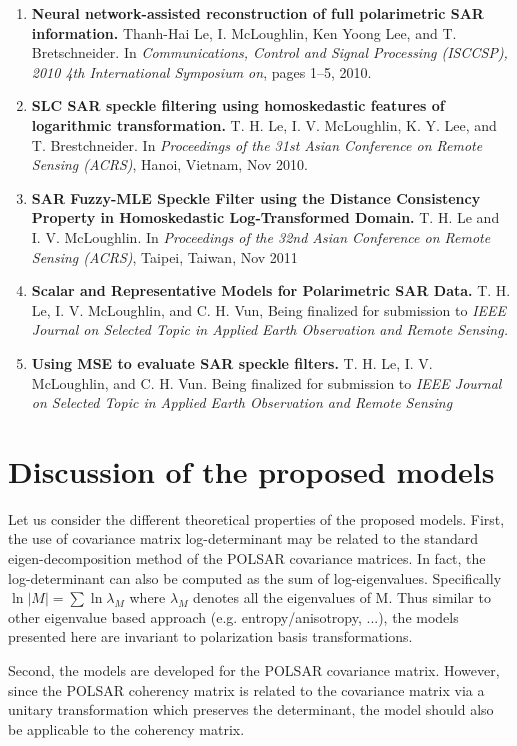 \begin{enumerate}
\item \textbf{Neural network-assisted reconstruction of full polarimetric SAR information.}
  Thanh-Hai Le, I. McLoughlin, Ken Yoong Lee, and T. Bretschneider.
  In \textit{Communications, Control and Signal Processing (ISCCSP), 2010 4th International Symposium on}, pages 1–5, 2010.  \cite{Le_2010_ISCCSP} 
\item \textbf{SLC SAR speckle filtering using homoskedastic features of logarithmic transformation.}
  T. H. Le, I. V. McLoughlin, K. Y. Lee, and T. Brestchneider.
  In \textit{Proceedings of the 31st Asian Conference on Remote Sensing (ACRS)}, Hanoi, Vietnam, Nov 2010. \cite{Le_2010_ACRS}
\item  \textbf{SAR Fuzzy-MLE Speckle Filter using the Distance Consistency Property in Homoskedastic Log-Transformed Domain.}
  T. H. Le and I. V. McLoughlin. 
  In \textit{Proceedings of the 32nd Asian Conference on Remote Sensing (ACRS)}, Taipei, Taiwan, Nov 2011 \cite{Le_2011_ACRS}
\item \textbf{Scalar and Representative Models for Polarimetric SAR Data.}
  T. H. Le, I. V. McLoughlin, and C. H. Vun,
  Being finalized for submission to \textit{IEEE Journal on Selected Topic in Applied Earth Observation and Remote Sensing.}
\item \textbf{Using MSE to evaluate SAR speckle filters.}
  T. H. Le, I. V. McLoughlin, and C. H. Vun.
  Being finalized for submission to \textit{IEEE Journal on Selected Topic in Applied Earth Observation and Remote Sensing}
\end{enumerate}
  
\section{Discussion of the proposed models}

Let us consider the different theoretical properties of the proposed models.
First, the use of covariance matrix log-determinant may be related to the standard eigen-decomposition method of the POLSAR covariance matrices.
In fact, the log-determinant can also be computed as the sum of log-eigenvalues.
Specifically $\ln{|M|} = \sum \ln{\lambda_M}$ where $\lambda_M$ denotes all the eigenvalues of M.
Thus similar to other eigenvalue based approach (e.g. entropy/anisotropy, ...),
  the models presented here are invariant to polarization basis transformations.

Second, the models are developed for the POLSAR covariance matrix.
However, since the POLSAR coherency matrix is related to the covariance matrix via a unitary transformation which preserves the determinant,
  the model should also be applicable to the coherency matrix.

